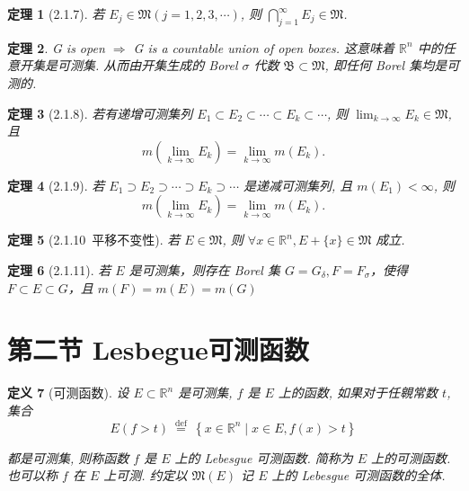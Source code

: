 \documentclass[10pt,openany]{book}
\theoremstyle{thmstyle} %
\newtheorem{theorem}{定理}[chapter]
\theoremstyle{defstyle} %
\newtheorem{definition}[theorem]{定义}
\theoremstyle{prostyle} %
\begin{document}
\begin{theorem}[2.1.7]
若 $E_j \in \mathfrak{M} (j=1,2,3,\cdots)$, 则 $\bigcap\limits_{j=1}^{\infty} E_j \in \mathfrak{M}$. 
\end{theorem}

\begin{theorem}
G is open $\Rightarrow$ G is a countable union of open boxes. 这意味着 $\mathbb{R}^n$ 中的任意开集是可测集. 从而由开集生成的 Borel $\sigma$ 代数 $\mathfrak{B} \subset \mathfrak{M}$, 即任何 Borel 集均是可测的.
\end{theorem}

\begin{theorem}[2.1.8]
若有递增可测集列 $E_1 \subset E_2 \subset \cdots \subset E_k \subset \cdots$, 则 $\lim _{k \rightarrow \infty} E_k \in \mathfrak{M}$, 且
$$
m\left(\lim _{k \rightarrow \infty} E_k\right)=\lim _{k \rightarrow \infty} m\left(E_k\right) .
$$
\end{theorem}

\begin{theorem}[2.1.9]
若 $E_1 \supset E_2 \supset \cdots \supset E_k \supset \cdots$ 是递减可测集列, 且 $m\left(E_1\right)<\infty$, 则
$$
m\left(\lim _{k \rightarrow \infty} E_k\right)=\lim _{k \rightarrow \infty} m\left(E_k\right) .
$$
\end{theorem}

\begin{theorem}[2.1.10~平移不变性]
若 $E \in \mathfrak{M}$, 则 $\forall x \in \mathbb{R}^n, E+\{x\} \in \mathfrak{M}$ 成立.
\end{theorem}

\begin{theorem}[2.1.11]
若 $E$ 是可测集，则存在 Borel 集 $G=G_{\delta},F=F_{\sigma}$，使得 $F \subset E \subset G$，且 $m(F) = m(E) = m(G)$
\end{theorem}








\section{第二节 Lesbegue可测函数}

\begin{definition}[可测函数]
设 $E \subset \mathbb{R}^n$ 是可测集, $f$ 是 $E$ 上的函数, 如果对于任䚌常数 $t$, 集合
\begin{equation}
E(f>t) \stackrel{\text { def }}{=}\left\{x \in \mathbb{R}^n \mid x \in E, f(x)>t\right\}
\end{equation}

都是可测集, 则称函数 $f$ 是 $E$ 上的 Lebesgue 可测函数. 简称为 $E$ 上的可测函数. 也可以称 $f$ 在 $E$ 上可测.
约定以 $\mathfrak{M}(E)$ 记 $E$ 上的 Lebesgue 可测函数的全体.
\end{definition}
\end{document}
